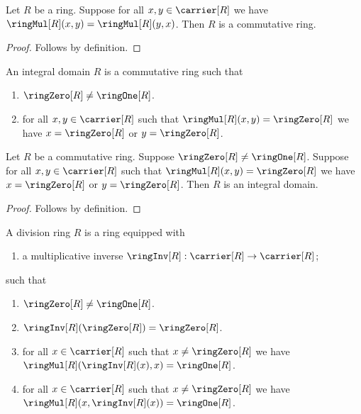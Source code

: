 \begin{proposition}\label{commutative_ring_intro}
    Let $R$ be a ring.
    Suppose for all $x,y\in\carrier[R]$ we have
        $\ringMul[R](x,y)=\ringMul[R](y,x)$.
    Then $R$ is a commutative ring.
\end{proposition}
\begin{proof}
    Follows by definition.
\end{proof}

\begin{struct}\label{integral_domain}
    An integral domain $R$ is a commutative ring such that
    \begin{enumerate}
        \item\label{integral_domain_nontrivial}
            $\ringZero[R]\neq\ringOne[R]$.
        \item\label{integral_domain_no_zero_divisors}
            for all $x,y\in\carrier[R]$ such that
                $\ringMul[R](x,y)=\ringZero[R]$ we have
                $x=\ringZero[R]$ or $y=\ringZero[R]$.
    \end{enumerate}
\end{struct}

\begin{proposition}\label{integral_domain_intro}
    Let $R$ be a commutative ring.
    Suppose $\ringZero[R]\neq\ringOne[R]$.
    Suppose for all $x,y\in\carrier[R]$ such that
        $\ringMul[R](x,y)=\ringZero[R]$ we have
        $x=\ringZero[R]$ or $y=\ringZero[R]$.
    Then $R$ is an integral domain.
\end{proposition}
\begin{proof}
    Follows by definition.
\end{proof}

\begin{struct}\label{division_ring}
    A division ring $R$ is a ring equipped with
    \begin{enumerate}
        \item\label{division_ring_inverse_graph}
            a multiplicative inverse
            $\ringInv[R]:\carrier[R]\to\carrier[R]$;
    \end{enumerate}
    such that
    \begin{enumerate}
        \item\label{division_ring_nontrivial}
            $\ringZero[R]\neq\ringOne[R]$.
        \item\label{division_ring_inverse_zero}
            $\ringInv[R](\ringZero[R])=\ringZero[R]$.
        \item\label{division_ring_inverse_left}
            for all $x\in\carrier[R]$ such that
                $x\neq\ringZero[R]$ we have
                $\ringMul[R](\ringInv[R](x),x)=\ringOne[R]$.
        \item\label{division_ring_inverse_right}
            for all $x\in\carrier[R]$ such that
                $x\neq\ringZero[R]$ we have
                $\ringMul[R](x,\ringInv[R](x))=\ringOne[R]$.
    \end{enumerate}
\end{struct}

